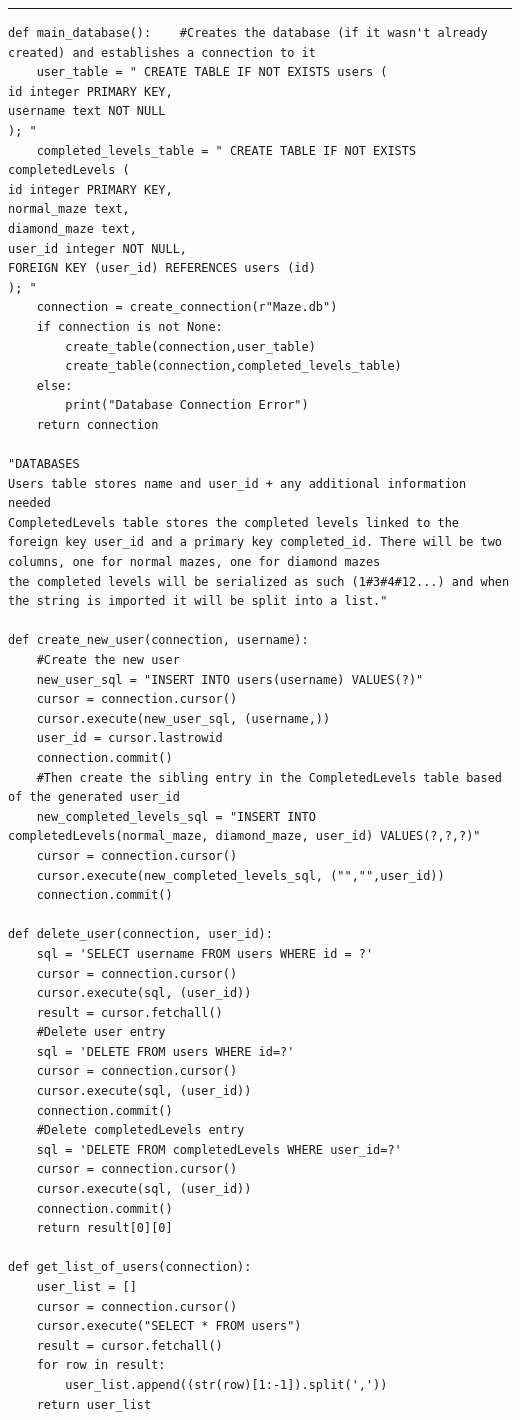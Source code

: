 \documentclass{article}
\begin{document}
\textcolor[RGB]{220,220,220}{\rule{\linewidth}{0.2pt}}
\begin{lstlisting}
def main_database():    #Creates the database (if it wasn't already created) and establishes a connection to it 
    user_table = " CREATE TABLE IF NOT EXISTS users (
id integer PRIMARY KEY,
username text NOT NULL
); "
    completed_levels_table = " CREATE TABLE IF NOT EXISTS completedLevels (
id integer PRIMARY KEY,
normal_maze text,
diamond_maze text,
user_id integer NOT NULL,
FOREIGN KEY (user_id) REFERENCES users (id)
); " 
    connection = create_connection(r"Maze.db")
    if connection is not None:
        create_table(connection,user_table)
        create_table(connection,completed_levels_table)
    else:
        print("Database Connection Error")
    return connection

"DATABASES
Users table stores name and user_id + any additional information needed
CompletedLevels table stores the completed levels linked to the foreign key user_id and a primary key completed_id. There will be two columns, one for normal mazes, one for diamond mazes
the completed levels will be serialized as such (1#3#4#12...) and when the string is imported it will be split into a list."

def create_new_user(connection, username):
    #Create the new user
    new_user_sql = "INSERT INTO users(username) VALUES(?)"
    cursor = connection.cursor()
    cursor.execute(new_user_sql, (username,))
    user_id = cursor.lastrowid
    connection.commit()
    #Then create the sibling entry in the CompletedLevels table based of the generated user_id
    new_completed_levels_sql = "INSERT INTO completedLevels(normal_maze, diamond_maze, user_id) VALUES(?,?,?)"
    cursor = connection.cursor()
    cursor.execute(new_completed_levels_sql, ("","",user_id))
    connection.commit()

def delete_user(connection, user_id):
    sql = 'SELECT username FROM users WHERE id = ?'
    cursor = connection.cursor()
    cursor.execute(sql, (user_id))
    result = cursor.fetchall()
    #Delete user entry
    sql = 'DELETE FROM users WHERE id=?'
    cursor = connection.cursor()
    cursor.execute(sql, (user_id))
    connection.commit()
    #Delete completedLevels entry
    sql = 'DELETE FROM completedLevels WHERE user_id=?'
    cursor = connection.cursor()
    cursor.execute(sql, (user_id))
    connection.commit()
    return result[0][0]

def get_list_of_users(connection):
    user_list = []
    cursor = connection.cursor()
    cursor.execute("SELECT * FROM users")
    result = cursor.fetchall()
    for row in result:
        user_list.append((str(row)[1:-1]).split(','))
    return user_list


\end{lstlisting}
\end{document}
